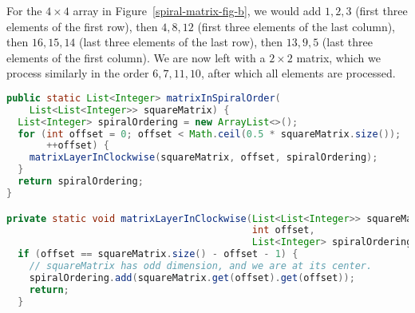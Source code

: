 \documentclass[10pt,openany,twoside,letterpaper,extrafontsizes]{memoir}
\newif\ifCpp
\newif\ifJava
\begin{document}
\begin{Spacing}{\arraysSpacing}
For the $4\times 4$ array  in Figure~\vref{spiral-matrix-fig-b},
we would add $1,2,3$ (first three elements of the first row), then
$4,8,12$ (first three elements of the last column), then
$16,15,14$ (last three elements of the last row), then
$13,9,5$ (last three elements of the first column). We are now left
with a $2 \times 2$ matrix, which we process similarly in the order $6,7,11,10$, after which
all elements are processed.
\ifCpp
\begin{lstlisting}[language={[11]C++}]
vector<int> MatrixInSpiralOrder(const vector<vector<int>>& square_matrix) {
  vector<int> spiral_ordering;
  for (int offset = 0; offset < ceil(0.5 * square_matrix.size()); ++offset) {
    MatrixLayerInClockwise(square_matrix, offset, &spiral_ordering);
  }
  return spiral_ordering;
}

void MatrixLayerInClockwise(const vector<vector<int>>& square_matrix,
                            int offset, vector<int>* spiral_ordering) {
  if (offset == square_matrix.size() - offset - 1) {
    // square_matrix has odd dimension, and we are at the center of
    // square_matrix.
    spiral_ordering->emplace_back(square_matrix[offset][offset]);
    return;
  }

  for (int j = offset; j < square_matrix.size() - offset - 1; ++j) {
    spiral_ordering->emplace_back(square_matrix[offset][j]);
  }
  for (int i = offset; i < square_matrix.size() - offset - 1; ++i) {
    spiral_ordering->emplace_back(
        square_matrix[i][square_matrix.size() - offset - 1]);
  }
  for (int j = square_matrix.size() - offset - 1; j > offset; --j) {
    spiral_ordering->emplace_back(
        square_matrix[square_matrix.size() - offset - 1][j]);
  }
  for (int i = square_matrix.size() - offset - 1; i > offset; --i) {
    spiral_ordering->emplace_back(square_matrix[i][offset]);
  }
}
\end{lstlisting}
\fi%
\ifJava
\begin{lstlisting}[language=Java]
public static List<Integer> matrixInSpiralOrder(
    List<List<Integer>> squareMatrix) {
  List<Integer> spiralOrdering = new ArrayList<>();
  for (int offset = 0; offset < Math.ceil(0.5 * squareMatrix.size());
       ++offset) {
    matrixLayerInClockwise(squareMatrix, offset, spiralOrdering);
  }
  return spiralOrdering;
}

private static void matrixLayerInClockwise(List<List<Integer>> squareMatrix,
                                           int offset,
                                           List<Integer> spiralOrdering) {
  if (offset == squareMatrix.size() - offset - 1) {
    // squareMatrix has odd dimension, and we are at its center.
    spiralOrdering.add(squareMatrix.get(offset).get(offset));
    return;
  }


\end{lstlisting}
\end{Spacing}
\end{document}
